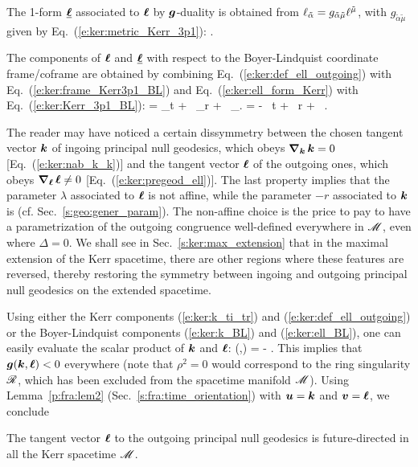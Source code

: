 The 1-form $\underline{\bm{\ell}}$ associated to $\bm{\ell}$ by
$\bm{g}$-duality is obtained
from $\ell_{\tilde{\alpha}} = g_{\tilde{\alpha}\tilde{\mu}} \ell^{\tilde{\mu}}$, with
$g_{\tilde{\alpha}\tilde{\mu}}$ given by Eq.~(\ref{e:ker:metric_Kerr_3p1}):
\be \label{e:ker:ell_form_Kerr}
     .
\ee

The components of $\bm{\ell}$ and $\underline{\bm{\ell}}$ with respect to the Boyer-Lindquist coordinate frame/coframe
are obtained by combining Eq.~(\ref{e:ker:def_ell_outgoing}) with Eq.~(\ref{e:ker:frame_Kerr3p1_BL})
and Eq.~(\ref{e:ker:ell_form_Kerr}) with Eq.~(\ref{e:ker:Kerr_3p1_BL}):
\be \label{e:ker:ell_BL}
    \wl =  \wpar_t + \, \wpar_r
    + \, \wpar_\ph .
\ee
\be \label{e:ker:ell_form_BL}
    \uu{\el} = - \, \dd t
     + \,  \dd r
     +  \, \dd \ph .
\ee


\begin{remark} \label{r:ker:k_versus_l}
The reader may have noticed a certain dissymmetry between the chosen tangent vector
$\bm{k}$ of ingoing principal null geodesics, which obeys $\bm{\nabla}_{\bm{k}}\, \bm{k} = 0$
[Eq.~(\ref{e:ker:nab_k_k})] and the tangent vector $\bm{\ell}$ of the outgoing
ones, which obeys $\bm{\nabla}_{\bm{\ell}}\, \bm{\ell} \not= 0$ [Eq.~(\ref{e:ker:pregeod_ell})].
The last property implies that the
parameter $\lambda$ associated to $\bm{\ell}$ is not affine, while the
parameter $-r$ associated to $\bm{k}$ is (cf. Sec.~\ref{s:geo:gener_param}).
The non-affine choice is the price to pay to have a parametrization of the outgoing
congruence well-defined everywhere in $\mathscr{M}$, even where $\Delta=0$. We shall see in
Sec.~\ref{s:ker:max_extension} that in the maximal extension of the Kerr spacetime, there are other regions where these features are reversed,
thereby restoring the symmetry between ingoing and outgoing principal null geodesics
on the extended spacetime.
\end{remark}


Using either the Kerr components (\ref{e:ker:k_ti_tr}) and
(\ref{e:ker:def_ell_outgoing})
or the Boyer-Lindquist components (\ref{e:ker:k_BL}) and (\ref{e:ker:ell_BL}),
one can easily evaluate the scalar product of $\bm{k}$ and $\bm{\ell}$:
\be \label{e:ker:k_scal_ell}
    (,\wl) = -  .
\ee
This implies that $\bm{g}(\bm{k},\bm{\ell}) < 0$ everywhere (note that $\rho^2= 0$
would correspond to the ring singularity $\mathscr{R}$, which has been excluded from
the spacetime manifold $\mathscr{M}$).
Using Lemma~\ref{p:fra:lem2} (Sec.~\ref{s:fra:time_orientation}) with $\bm{u}=\bm{k}$ and
$\bm{v} = \bm{\ell}$, we conclude
\begin{prop}
\label{p:ker:el_future_directed}
The tangent vector $\bm{\ell}$ to the outgoing principal null geodesics
is future-directed in all the Kerr spacetime $\mathscr{M}$.
\end{prop}

